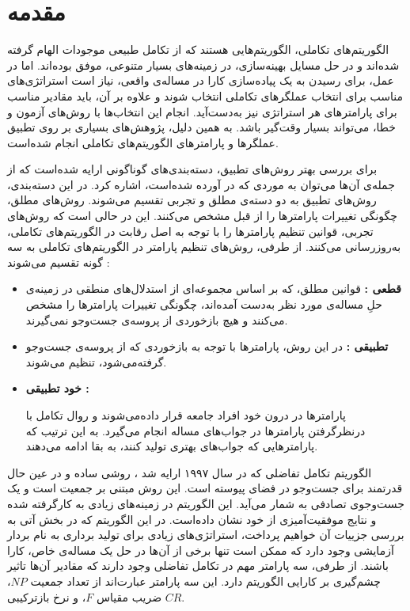 \documentclass[12pt,a4paper]{article}
\newcommand{\nocontentsline}[3]{}
\newcommand{\tocless}[2]{\bgroup\let\addcontentsline=\nocontentsline#1{#2}\egroup}
\theoremstyle{definition}
\theoremstyle{theorem}
\theoremstyle{definition}
\begin{document}
\newpage
\tocless\tableofcontents
\newpage 
{}
\section{مقدمه}
الگوریتم‌های تکاملی، الگوریتم‌هایی هستند که از تکامل طبیعی موجودات الهام گرفته‌ شده‌اند و در حل مسایل بهینه‌سازی، در زمینه‌های بسیار متنوعی، موفق بوده‌اند. اما در عمل، برای رسیدن به یک پیاده‌سازی کارا در مساله‌ی واقعی، نیاز است استراتژی‌های مناسب برای انتخاب عملگر‌های تکاملی انتخاب شوند و علاوه‌ بر آن، باید مقادیر مناسب برای پارامترهای هر استراتژی نیز به‌دست‌آید. انجام این انتخاب‌ها با روش‌های آزمون و خطا، می‌تواند بسیار وقت‌گیر باشد. به همین دلیل، پژوهش‌های بسیاری بر روی تطبیق عملگرها و پارامترهای الگوریتم‌های تکاملی انجام شده‌است.

برای بررسی بهتر روش‌های تطبیق، دسته‌بندی‌های گوناگونی ارایه شده‌است که از جمله‌ی آن‌ها می‌توان به موردی که در \cite{category} آورده‌ شده‌است، اشاره کرد. در این دسته‌بندی، روش‌های تطبیق به دو دسته‌ی مطلق و تجربی تقسیم می‌شوند. روش‌های مطلق، چگونگی تغییرات پارامترها را از قبل مشخص می‌کنند. این در حالی است که روش‌های تجربی، قوانین تنظیم پارامترها را با توجه به اصل رقابت در الگوریتم‌های تکاملی، به‌روز‌رسانی می‌کنند. از طرفی، روش‌های تنظیم پارامتر در الگوریتم‌های تکاملی به سه گونه تقسیم می‌شوند \cite{adapt-category} : 


\begin{itemize}
\renewcommand{\labelitemi}{$\bullet$}

\item \textbf{قطعی :‌ }
قوانین مطلق، که بر اساس مجموعه‌ای از استدلال‌های منطقی در زمینه‌ی حلِ مساله‌ی مورد نظر به‌دست آمده‌اند، چگونگی تغییرات پارامترها را مشخص می‌کنند و هیچ بازخوردی از پروسه‌ی جست‌وجو نمی‌گیرند. 

\item \textbf{تطبیقی : }در این روش، پارامترها با توجه به بازخوردی که از پروسه‌ی جست‌وجو گرفته‌‌می‌شود، تنظیم می‌شوند.

\item \textbf{خود تطبیقی : }
 
پارامترها در درون خود افراد جامعه قرار داده‌می‌شوند و روال تکامل با درنظرگرفتن پارامترها در جواب‌های مساله انجام می‌گیرد. به این ترتیب که پارامترهایی که جواب‌های بهتری تولید کنند، به بقا ادامه می‌دهند.
\end{itemize}


الگوریتم تکامل تفاضلی  که در سال ۱۹۹۷ ارایه شد \cite{DE}، روشی ساده و در عین حال قدرتمند برای جست‌وجو در فضای پیوسته است. این روش مبتنی بر جمعیت است و یک جست‌وجوی تصادفی به شمار می‌آید. این الگوریتم در زمینه‌های زیادی به کارگرفته شده و نتایج موفقیت‌آمیزی از خود نشان‌ داده‌است. در این الگوریتم که در بخش آتی به بررسی جزییات آن خواهیم پرداخت، استراتژی‌های زیادی برای تولید برداری به نام بردار آزمایشی وجود دارد که ممکن است تنها برخی از آن‌ها در حل یک مساله‌ی خاص، کارا باشند. از طرفی، سه پارامتر مهم در تکامل تفاضلی وجود دارند که مقادیر آن‌ها تاثیر چشم‌گیری بر کارایی الگوریتم دارد. این سه پارامتر عبارت‌اند از تعداد جمعیت 
$\mathit{NP}$، 
ضریب مقیاس
$\mathit{F}$،
و نرخ بازترکیبی
$\mathit{CR}$.
\end{document}
